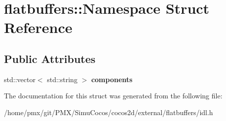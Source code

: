 \hypertarget{structflatbuffers_1_1Namespace}{}\section{flatbuffers\+:\+:Namespace Struct Reference}
\label{structflatbuffers_1_1Namespace}
\subsection*{Public Attributes}
\begin{DoxyCompactItemize}
\item 
\mbox{\label{structflatbuffers_1_1Namespace_a84e0421de6fb4f9a48e6f430baa9eacb}} 
std\+::vector$<$ std\+::string $>$ {\bfseries components}
\end{DoxyCompactItemize}


The documentation for this struct was generated from the following file\+:\begin{DoxyCompactItemize}
\item 
/home/pmx/git/\+P\+M\+X/\+Simu\+Cocos/cocos2d/external/flatbuffers/idl.\+h\end{DoxyCompactItemize}
